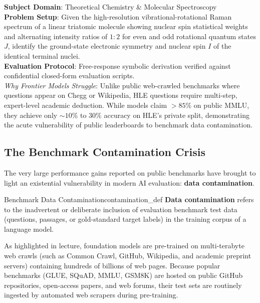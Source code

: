 \documentclass[../../../main.tex]{subfiles}
\begin{document}
\begin{center}
\begin{minipage}{0.95\textwidth}
\begin{tcolorbox}[colback=cardBg,colframe=cardLine,arc=2pt,boxrule=0.5pt,title=\textbf{Humanity's Last Exam (HLE) Example: Multimodal Expert Reasoning}]
\small\sffamily
\textbf{Subject Domain}: Theoretical Chemistry \& Molecular Spectroscopy \\
\textbf{Problem Setup}: Given the high-resolution vibrational-rotational Raman spectrum of a linear triatomic molecule showing nuclear spin statistical weights and alternating intensity ratios of $1:2$ for even and odd rotational quantum states $J$, identify the ground-state electronic symmetry and nuclear spin $I$ of the identical terminal nuclei. \\
\textbf{Evaluation Protocol}: Free-response symbolic derivation verified against confidential closed-form evaluation scripts. \\
\textit{Why Frontier Models Struggle}: Unlike public web-crawled benchmarks where questions appear on Chegg or Wikipedia, HLE questions require multi-step, expert-level academic deduction. While models claim $>85\%$ on public MMLU, they achieve only $\sim 10\%$ to $30\%$ accuracy on HLE's private split, demonstrating the acute vulnerability of public leaderboards to benchmark data contamination.
\end{tcolorbox}
\end{minipage}
\end{center}

\subsection{The Benchmark Contamination Crisis}
\label{subsec:contamination_crisis}

The very large performance gains reported on public benchmarks have brought to light an existential vulnerability in modern AI evaluation: \textbf{data contamination}.

\begin{definition}{Benchmark Data Contamination}{contamination_def}
\textbf{Data contamination} refers to the inadvertent or deliberate inclusion of evaluation benchmark test data (questions, passages, or gold-standard target labels) in the training corpus of a language model.
\end{definition}

As highlighted in lecture, foundation models are pre-trained on multi-terabyte web crawls (such as Common Crawl, GitHub, Wikipedia, and academic preprint servers) containing hundreds of billions of web pages. Because popular benchmarks (GLUE, SQuAD, MMLU, GSM8K) are hosted on public GitHub repositories, open-access papers, and web forums, their test sets are routinely ingested by automated web scrapers during pre-training.
\end{document}
